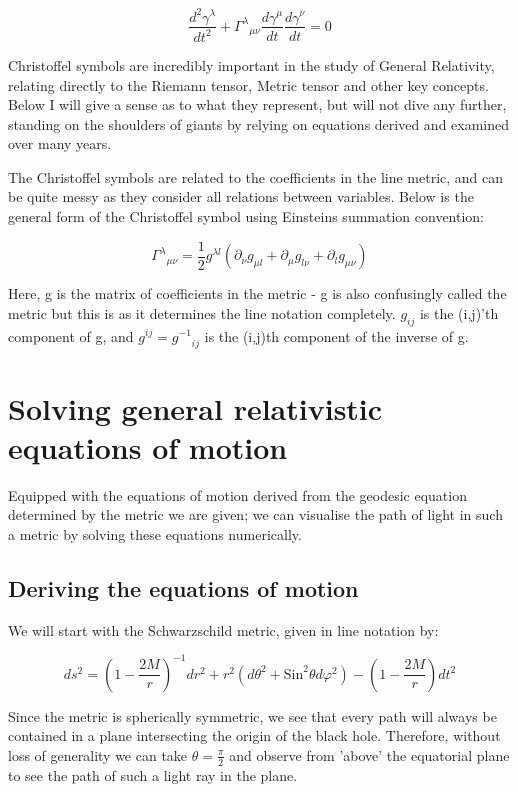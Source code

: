 \documentclass[oneside,openright,frontopenright]{dmathesis}
\begin{document}
	\[\frac{d^2 \gamma^\lambda}{dt^2} + {\Gamma^\lambda}_{\mu\nu} \frac{d\gamma^\mu}{dt} \frac{d\gamma^\nu}{dt} = 0\]

	Christoffel symbols are incredibly important in the study of General Relativity, relating directly to the Riemann tensor, Metric tensor and other key concepts. Below I will give a sense as to what they represent, but will not dive any further, standing on the shoulders of giants by relying on equations derived and examined over many years.

	The Christoffel symbols are related to the coefficients in the line metric, and can be quite messy as they consider all relations between variables. Below is the general form of the Christoffel symbol using Einsteins summation convention\cite[pg. 13-14]{albert1916foundation}:
	
	\[{\Gamma^\lambda}_{\mu\nu} = \frac{1}{2}g^{\lambda{l}}(\partial_{\nu}g_{\mu{l}} + \partial_{\mu}g_{l\nu} + \partial_{l}g_{\mu\nu})\]
	
	Here, g is the matrix of coefficients in the metric - g is also confusingly called the metric but this is as it determines the line notation completely. $g_{ij}$ is the (i,j)'th component of g, and $g^{ij} = {g^{-1}}_{ij}$ is the (i,j)th component of the inverse of g.

\chapter{Solving general relativistic equations of motion}

	Equipped with the equations of motion derived from the geodesic equation determined by the metric we are given; we can visualise the path of light in such a metric by solving these equations numerically.


\section{Deriving the equations of motion}
	
	We will start with the Schwarzschild metric, given in line notation by\cite{derivationSchwarzschild}: 


	\[{ds^{2} = {\left(1-\frac {2M}{r}\right)}^{-1}} {dr^2} + {r^2}({d\theta ^2} + {\mbox{Sin} ^2}{\theta}{d\varphi ^2}) -{\left(1-\frac {2M}{r}\right)}{dt^2}\]


	Since the metric is spherically symmetric, we see that every path will always be contained in a plane intersecting the origin of the black hole. Therefore, without loss of generality we can take ${\theta}=\frac{\pi}{2}$ and observe from 'above’ the equatorial plane to see the path of such a light ray in the plane.
\end{document}
